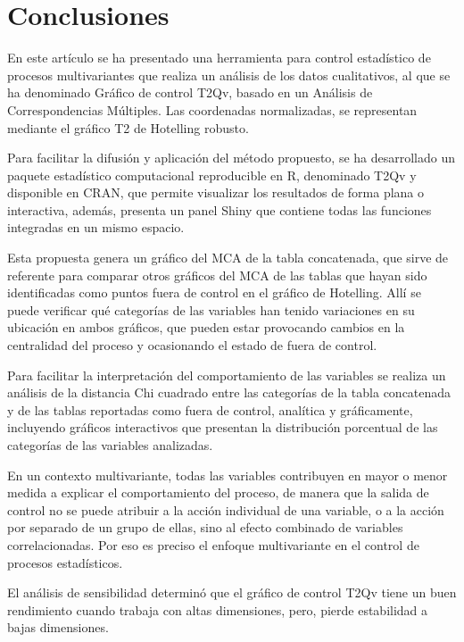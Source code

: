 \documentclass[mathematics,article,submit,moreauthors,pdftex]{mdpi}
\begin{document}
\hypertarget{conclusiones}{%
\section{Conclusiones}\label{conclusiones}}

En este artículo se ha presentado una herramienta para control
estadístico de procesos multivariantes que realiza un análisis de los
datos cualitativos, al que se ha denominado Gráfico de control T2Qv,
basado en un Análisis de Correspondencias Múltiples. Las coordenadas
normalizadas, se representan mediante el gráfico T2 de Hotelling
robusto.

Para facilitar la difusión y aplicación del método propuesto, se ha
desarrollado un paquete estadístico computacional reproducible en R,
denominado T2Qv y disponible en CRAN, que permite visualizar los
resultados de forma plana o interactiva, además, presenta un panel Shiny
que contiene todas las funciones integradas en un mismo espacio.

Esta propuesta genera un gráfico del MCA de la tabla concatenada, que
sirve de referente para comparar otros gráficos del MCA de las tablas
que hayan sido identificadas como puntos fuera de control en el gráfico
de Hotelling. Allí se puede verificar qué categorías de las variables
han tenido variaciones en su ubicación en ambos gráficos, que pueden
estar provocando cambios en la centralidad del proceso y ocasionando el
estado de fuera de control.

Para facilitar la interpretación del comportamiento de las variables se
realiza un análisis de la distancia Chi cuadrado entre las categorías de
la tabla concatenada y de las tablas reportadas como fuera de control,
analítica y gráficamente, incluyendo gráficos interactivos que presentan
la distribución porcentual de las categorías de las variables
analizadas.

En un contexto multivariante, todas las variables contribuyen en mayor o
menor medida a explicar el comportamiento del proceso, de manera que la
salida de control no se puede atribuir a la acción individual de una
variable, o a la acción por separado de un grupo de ellas, sino al
efecto combinado de variables correlacionadas. Por eso es preciso el
enfoque multivariante en el control de procesos estadísticos.

El análisis de sensibilidad determinó que el gráfico de control T2Qv
tiene un buen rendimiento cuando trabaja con altas dimensiones, pero,
pierde estabilidad a bajas dimensiones.
\end{document}
